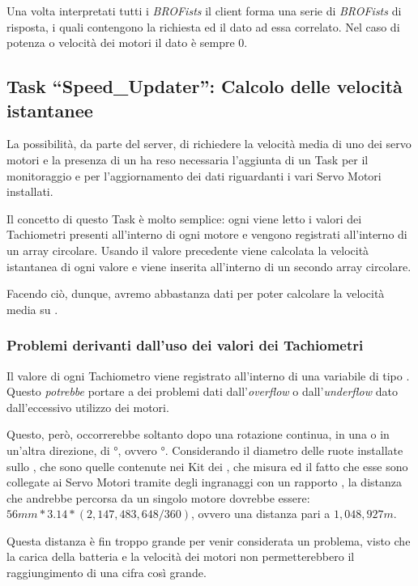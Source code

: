 Una volta interpretati tutti i \emph{BROFists} il client forma una serie di
\emph{BROFists} di risposta, i quali contengono la richiesta ed il dato ad
essa correlato. Nel caso di potenza o velocità dei motori il dato è sempre
$0$.

\subsection[Task ``Speed\_Updater'']{Task ``Speed\_Updater'': Calcolo delle
velocità istantanee}\label{sec:BROSpdS}
La possibilità, da parte del server, di richiedere la velocità media di uno
dei servo motori e la presenza di un \PID{} ha reso necessaria l'aggiunta
di un Task per il monitoraggio e per l'aggiornamento dei dati riguardanti i
vari Servo Motori installati.

Il concetto di questo Task è molto semplice: ogni  viene letto i valori
dei Tachiometri presenti all'interno di ogni motore e vengono registrati
all'interno di un array circolare. Usando il valore precedente viene
calcolata la velocità istantanea di ogni valore e viene inserita
all'interno di un secondo array circolare.

Facendo ciò, dunque, avremo abbastanza dati per poter calcolare la velocità
media su .

\subsubsection{Problemi derivanti dall'uso dei valori dei Tachiometri}
Il valore di ogni Tachiometro viene registrato all'interno di una variabile
di tipo . Questo \emph{potrebbe} portare a dei problemi
dati dall'\emph{overflow} o dall'\emph{underflow} dato dall'eccessivo
utilizzo dei motori.

Questo, però, occorrerebbe soltanto dopo una rotazione continua, in una o
in un'altra direzione, di °, ovvero
°. Considerando il diametro delle ruote installate
sullo \SPAM{}, che sono quelle contenute nei Kit  dei
\nxt{}, che misura \cypher{56mm} ed il fatto che esse sono collegate ai
Servo Motori tramite degli ingranaggi con un rapporto , la
distanza che andrebbe percorsa da un singolo motore dovrebbe essere: $56mm
* 3.14 * (2,147,483,648 / 360)$, ovvero una distanza pari a $1,048,927m$.

Questa distanza è fin troppo grande per venir considerata un problema,
visto che la carica della batteria e la velocità dei motori non
permetterebbero il raggiungimento di una cifra così grande.

